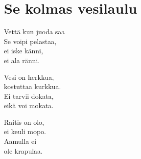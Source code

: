 \section{Se kolmas vesilaulu}

Vettä kun juoda saa\\
Se voipi pelastaa,\\
ei iske känni,\\
ei ala ränni.

Vesi on herkkua,\\
kostuttaa kurkkua.\\
Ei tarvii dokata,\\
eikä voi mokata.

Raitis on olo,\\
ei keuli mopo.\\
Aamulla ei\\
ole krapulaa.